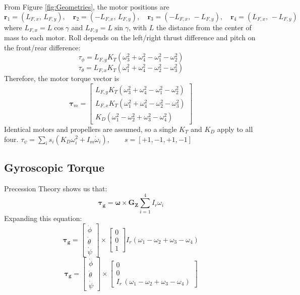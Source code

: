 \documentclass[conf]{new-aiaa}
\begin{document}
From Figure \ref{fig:Geometries}, the motor positions are
$$\mathbf{r}_1=(L_{F,x},\,L_{F,y}),\quad \mathbf{r}_2=(-L_{F,x},\,L_{F,y}),\quad \mathbf{r}_3=(-L_{F,x},\,-L_{F,y}),\quad \mathbf{r}_4=(L_{F,x},\,-L_{F,y})$$
where $L_{F,x}=L\cos\gamma$ and $L_{F,y}=L\sin\gamma$, with $L$ the distance from the center of mass to each motor. Roll depends on the left/right thrust difference and pitch on the front/rear difference:
$$\tau_\phi = L_{F,y}K_T\left(\omega_3^2+\omega_4^2-\omega_1^2-\omega_2^2\right)$$
$$\tau_\theta = L_{F,x}K_T\left(\omega_1^2+\omega_4^2-\omega_2^2-\omega_3^2\right)$$
Therefore, the motor torque vector is
$$\boxed{\boldsymbol{\tau}_m = \begin{bmatrix}
    L_{F,y}K_T\left(\omega_3^2+\omega_4^2-\omega_1^2-\omega_2^2\right)\\[2pt]
    L_{F,x}K_T\left(\omega_1^2+\omega_4^2-\omega_2^2-\omega_3^2\right)\\[2pt]
    K_D\left(\omega_1^2-\omega_2^2+\omega_3^2-\omega_4^2\right)
\end{bmatrix}}$$
Identical motors and propellers are assumed, so a single $K_T$ and $K_D$ apply to all four.
$\tau_\psi = \sum_i s_i\left(K_D\omega_i^2 + I_m\dot\omega_i\right),\qquad s=[+1,-1,+1,-1]$



\subsection{Gyroscopic Torque}
Precession Theory shows us that:
$$\mathbf{\tau_g} = \mathbf{\omega} \times \mathbf{G_Z} \sum_{i=1}^{4} I_r \omega_i$$
Expanding this equation:
$$\mathbf{\tau_g} = \begin{bmatrix}
    \dot{\phi}\\\dot{\theta}\\\dot{\psi}
\end{bmatrix}\times \begin{bmatrix}
    0\\0\\1
\end{bmatrix} I_r (\omega_1-\omega_2+\omega_3-\omega_4)$$
$$\boxed{\mathbf{\tau_g} = \begin{bmatrix}
    \dot{\phi}\\\dot{\theta}\\\dot{\psi}
\end{bmatrix}\times\left[\begin{array}{c}
0\\
0\\
I_r \,{\left(\omega_1 -\omega_2 +\omega_3 -\omega_4 \right)}
\end{array}\right]}$$
\end{document}

